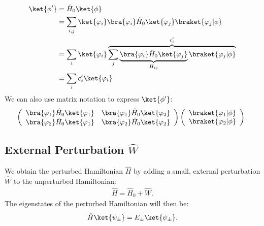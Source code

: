 			\begin{align}
				\ket{\phi'} &=\hat{H}_0 \ket{\phi}\\ 
				&= \sum\limits_{i,j} \ket{\varphi_i}\bra{\varphi_i} \hat{H}_0 \ket{\varphi_j}\braket{\varphi_j|\phi}\\
				&= \sum\limits_i \ket{\varphi_i} \overbrace{\sum\limits_j  \underbrace{\bra{\varphi_i} \hat{H}_0 \ket{\varphi_j} }_{H_{ij}}  \braket{\varphi_j|\phi}}^{c_i'}\\
				&= \sum_i c_i' \ket{\varphi_i}
			\end{align}
			We can also use matrix notation to express $\ket{\phi'}$:
			\begin{align}
				\left( \begin{array}{cc} \bra{\varphi_1}\hat{H}_0\ket{\varphi_1} & \bra{\varphi_1}\hat{H}_0\ket{\varphi_2} \\ \bra{\varphi_2}\hat{H}_0\ket{\varphi_1} & \bra{\varphi_2}\hat{H}_0\ket{\varphi_2} \end{array} \right)\left( \begin{array}{c} \braket{\varphi_1 | \phi} \\ \braket{\varphi_2|\phi} \end{array} \right).
			\end{align}

		\subsection{External Perturbation $\hat{W}$}

			We obtain the perturbed Hamiltonian $\hat{H}$ by adding a small, external perturbation  $\hat{W}$ to the unperturbed Hamiltonian:
			\begin{align} \label{eq:perturbedhamiltonian}
				\hat{H} = \hat{H}_0 + \hat{W}.
			\end{align}
			The eigenstates of the perturbed Hamiltonian will then be:
			\begin{align}
				\hat{H}\ket{\psi_{\pm}}=E_\pm \ket{\psi_\pm}.
			\end{align}

